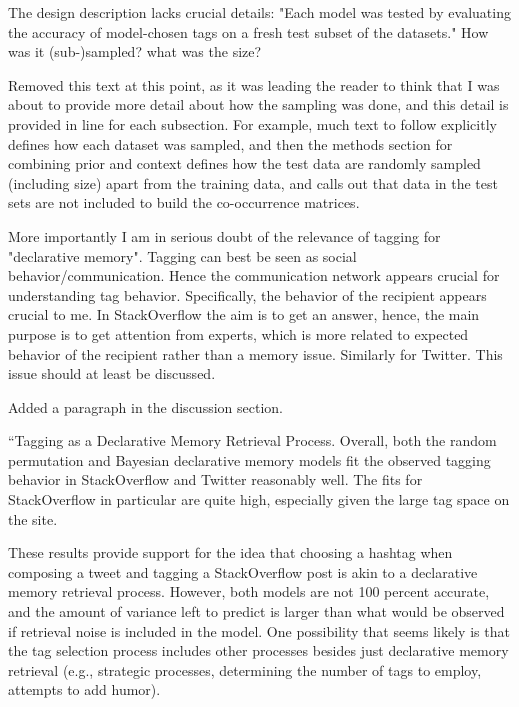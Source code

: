 \documentclass[answers,12pt]{exam}
\begin{document}
\begin{questions}
\question The design description lacks crucial details: "Each model was tested by evaluating the accuracy of model-chosen tags on a fresh test subset of the datasets." How was it (sub-)sampled? what was the size?

\begin{solution}
  Removed this text at this point, as it was leading the reader to think that I was about to provide more detail about how the sampling was done, and this detail is provided in line for each subsection. For example, much text to follow explicitly defines how each dataset was sampled, and then the methods section for combining prior and context defines how the test data are randomly sampled (including size) apart from the training data, and calls out that data in the test sets are not included to build the co-occurrence matrices.
\end{solution}

\question More importantly I am in serious doubt of the relevance of tagging for "declarative memory". Tagging can best be seen as social behavior/communication. Hence the communication network appears crucial for understanding tag behavior. Specifically, the behavior of the recipient appears crucial to me. In StackOverflow the aim is to get an answer, hence, the main purpose is to get attention from experts, which is more related to expected behavior of the recipient rather than a memory issue. Similarly for Twitter. This issue should at least be discussed.

\begin{solution}
Added a paragraph in the discussion section.

``Tagging as a Declarative Memory Retrieval Process. Overall, both the random permutation and Bayesian declarative memory models fit the observed tagging behavior in StackOverflow and Twitter reasonably well. The fits for StackOverflow in particular are quite high, especially given the large tag space on the site.

These results provide support for the idea that choosing a hashtag when composing a tweet and tagging a StackOverflow post is akin to a declarative memory retrieval process. However, both models are not 100 percent accurate, and the amount of variance left to predict is larger than what would be observed if retrieval noise is included in the model. One possibility that seems likely is that the tag selection process includes other processes besides just declarative memory retrieval (e.g., strategic processes, determining the number of tags to employ, attempts to add humor).


\end{solution}
\end{questions}
\end{document}
